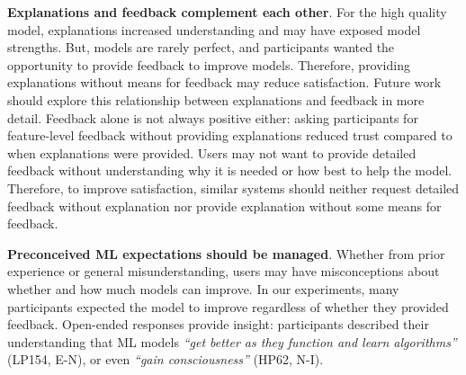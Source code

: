\textbf{Explanations and feedback complement each other}.
%
For the high quality model, explanations increased understanding and may have exposed model strengths. But, models are rarely perfect, and participants wanted the opportunity to provide feedback to improve models. Therefore, providing explanations without means for feedback may reduce satisfaction. Future work should explore this relationship between explanations and feedback in more detail. 
Feedback alone is not always positive either: asking participants for feature-level feedback without providing explanations reduced trust compared to when explanations were provided. Users may not want to provide detailed feedback without understanding why it is needed or how best to help the model. 
%
Therefore, to improve satisfaction, similar systems should neither request detailed feedback without explanation nor provide explanation without some means for feedback.

\textbf{Preconceived ML expectations should be managed}.
Whether from prior experience or general misunderstanding, users may have misconceptions about whether and how much models can improve. In our experiments, many participants expected the model to improve regardless of whether they provided feedback. 
%
Open-ended responses provide insight: participants described their understanding that ML models  %
\textit{``get better as they function and learn algorithms''} (LP154, E-N), or even \textit{``gain consciousness''} (HP62, N-I).
%

